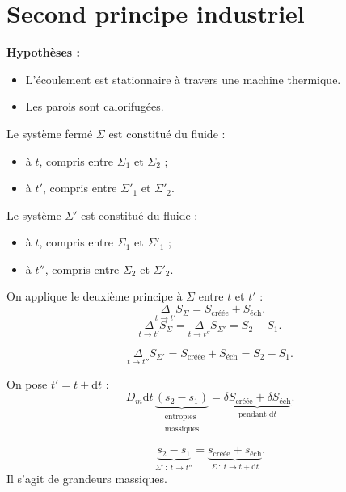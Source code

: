 \documentclass[11pt,a4paper]{article}
\newcommand{\zone}[1]{\tikz[baseline=(z.base)]\node[draw,circle,inner sep=1pt,font=\scriptsize,minimum size=3.5mm](z){#1};}
\newcommand{\dd}{\mathrm d}
\newcommand{\etoiles}[1]{\foreach \i in {1,...,#1}{\mathord{\star}\,}}
\begin{document}
\section{Second principe industriel}
\begin{center}
\end{center}
\textbf{Hypothèses :}
\begin{itemize}
\item L'écoulement est stationnaire à travers une machine thermique.
\item Les parois sont calorifugées.
\end{itemize}
Le système fermé $\Sigma$ est constitué du fluide :
\begin{itemize}
\item à $t$, compris entre $\Sigma_1$ et $\Sigma_2$ ;
\item à $t'$, compris entre $\Sigma'_1$ et $\Sigma'_2$.
\end{itemize}
Le système $\Sigma'$ est constitué du fluide :
\begin{itemize}
\item à $t$, compris entre $\Sigma_1$ et $\Sigma'_1$ ;
\item à $t''$, compris entre $\Sigma_2$ et $\Sigma'_2$.
\end{itemize}
On applique le deuxième principe à $\Sigma$ entre $t$ et $t'$ :
\[
\underset{t\to t'}{\Delta}S_\Sigma=S_{\text{créée}}+S_{\text{éch}}.
\]
\[
\underset{t\to t'}{\Delta}S_\Sigma
=\underset{t\to t''}{\Delta}S_{\Sigma'}=S_2-S_1.
\]
\begin{cadre}
\[
\underset{t\to t''}{\Delta}S_{\Sigma'}=S_{\text{créée}}+S_{\text{éch}}=S_2-S_1.
\]
\end{cadre}
On pose $t'=t+\dd t$ :
\[
D_m\dd t\,\underbrace{(s_2-s_1)}_{\substack{\text{entropies}\\\text{massiques}}}
=\underbrace{\delta S_{\text{créée}}+\delta S_{\text{éch}}}_{\text{pendant }\dd t}.
\]
\begin{cadre}[etoiles={\etoiles{3}}]
\[
\underbrace{s_2-s_1}_{\Sigma'\,:\ t\to t''}
=\underbrace{s_{\text{créée}}+s_{\text{éch}}}_{\Sigma\,:\ t\to t+\dd t}.
\]
Il s'agit de grandeurs massiques.
\end{cadre}
\end{document}

